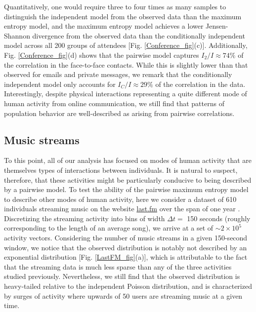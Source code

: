 \documentclass[aps,reprint,superscriptaddress,amsmath,amssymb,longbibliography]{revtex4-1}
\begin{document}
Quantitatively, one would require three to four times as many samples to distinguish the independent model from the observed data than the maximum entropy model, and the maximum entropy model achieves a lower Jensen-Shannon divergence from the observed data than the conditionally independent model across all 200 groups of attendees [Fig. \ref{Conference_fig}(c)]. Additionally, Fig. \ref{Conference_fig}(d) shows that the pairwise model captures $I_2/I \approx 74\%$ of the correlation in the face-to-face contacts. While this is slightly lower than that observed for emails and private messages, we remark that the conditionally independent model only accounts for $I_C/I \approx 29\%$ of the correlation in the data. Interestingly, despite physical interactions representing a quite different mode of human activity from online communication, we still find that patterns of population behavior are well-described as arising from pairwise correlations.

\subsection{Music streams}

\label{LastFM}

To this point, all of our analysis has focused on modes of human activity that are themselves types of interactions between individuals. It is natural to suspect, therefore, that these activities might be particularly conducive to being described by a pairwise model. To test the ability of the pairwise maximum entropy model to describe other modes of human activity, here we consider a dataset of 610 individuals streaming music on the website \url{last.fm} over the span of one year \cite{Celma-01}. Discretizing the streaming activity into bins of width $\Delta t = $ 150 seconds (roughly corresponding to the length of an average song), we arrive at a set of $\sim 2\times 10^5$ activity vectors. Considering the number of music streams in a given 150-second window, we notice that the observed distribution is notably not described by an exponential distribution [Fig. \ref{LastFM_fig}(a)], which is attributable to the fact that the streaming data is much less sparse than any of the three activities studied previously. Nevertheless, we still find that the observed distribution is heavy-tailed relative to the independent Poisson distribution, and is characterized by surges of activity where upwards of 50 users are streaming music at a given time.
\end{document}

